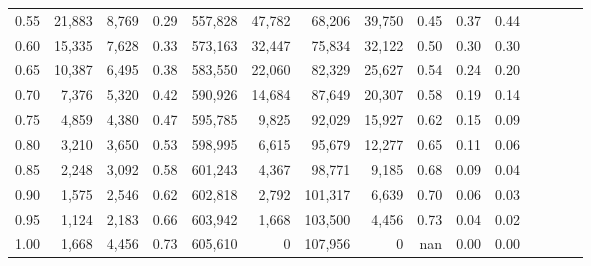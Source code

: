 \begin{tabular}{rrrcrrrrrrrrrrr}
0.55 &  21,883 &   8,769 &                                       0.29 &  557,828 &   47,782 &   68,206 &   39,750 &  0.45 &  0.37 &                         0.44 \\
0.60 &  15,335 &   7,628 &                                       0.33 &  573,163 &   32,447 &   75,834 &   32,122 &  0.50 &  0.30 &                         0.30 \\
0.65 &  10,387 &   6,495 &                                       0.38 &  583,550 &   22,060 &   82,329 &   25,627 &  0.54 &  0.24 &                         0.20 \\
0.70 &   7,376 &   5,320 &                                       0.42 &  590,926 &   14,684 &   87,649 &   20,307 &  0.58 &  0.19 &                         0.14 \\
0.75 &   4,859 &   4,380 &                                       0.47 &  595,785 &    9,825 &   92,029 &   15,927 &  0.62 &  0.15 &                         0.09 \\
0.80 &   3,210 &   3,650 &                                       0.53 &  598,995 &    6,615 &   95,679 &   12,277 &  0.65 &  0.11 &                         0.06 \\
0.85 &   2,248 &   3,092 &                                       0.58 &  601,243 &    4,367 &   98,771 &    9,185 &  0.68 &  0.09 &                         0.04 \\
0.90 &   1,575 &   2,546 &                                       0.62 &  602,818 &    2,792 &  101,317 &    6,639 &  0.70 &  0.06 &                         0.03 \\
0.95 &   1,124 &   2,183 &                                       0.66 &  603,942 &    1,668 &  103,500 &    4,456 &  0.73 &  0.04 &                         0.02 \\
1.00 &   1,668 &   4,456 &                                       0.73 &  605,610 &        0 &  107,956 &        0 &   nan &  0.00 &                         0.00 \\
\bottomrule
\end{tabular}
